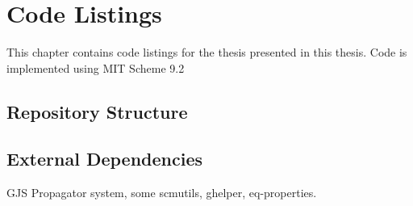\chapter{Code Listings}
\label{chap:code}

This chapter contains code listings for the thesis presented in this
thesis. Code is implemented using MIT Scheme 9.2

\section{Repository Structure}

\section{External Dependencies}

GJS Propagator system, some scmutils, ghelper, eq-properties.


\lstlistoflistings



\newcommand{\includecode}[2][c]{}
\linespread{1}

\addtolength{\oddsidemargin}{-.4in}
\addtolength{\evensidemargin}{-.4in}
\addtolength{\textwidth}{0.8in}

